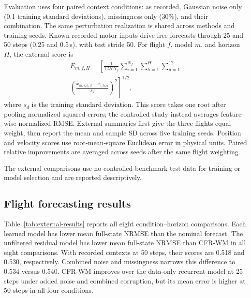 \documentclass[pdflatex,sn-basic]{sn-jnl}
\newcommand{\ExternalCFRCombinedLongNRMSEMean}{0.540}
\newcommand{\ExternalCFRRecordedLongNRMSEMean}{0.530}
\newcommand{\ExternalUnfilteredCombinedLongNRMSEMean}{0.534}
\newcommand{\ExternalUnfilteredRecordedLongNRMSEMean}{0.518}
\begin{document}
Evaluation uses four paired context conditions: as recorded, Gaussian noise
only (0.1 training standard deviations), missingness only (30\%), and their
combination. The same perturbation realization is shared across methods and
training seeds. Known recorded motor inputs drive free forecasts through
25 and 50 steps (0.25 and 0.5\,s), with test stride 50. For flight $f$, model
$m$, and horizon $H$, the external score is
\begin{equation}
\begin{aligned}
 E_{m,f,H}=\left[\frac{1}{12H N_f}
 \sum_{i=1}^{N_f}\sum_{h=1}^{H}\sum_{d=1}^{12}\right.\\[-0.2em]
 \left.\left(\frac{\widehat{x}_{m,i,h,d}-x_{i,h,d}}{s_d}\right)^2
 \right]^{1/2},
\end{aligned}
 \label{eq:external-score}
\end{equation}
where $s_d$ is the training standard deviation. This score takes one root
after pooling normalized squared errors; the controlled study instead
averages feature-wise normalized RMSE. External summaries first give the
three flights equal weight, then report the mean and sample SD across five
training seeds. Position and velocity scores use root-mean-square Euclidean
error in physical units. Paired relative improvements are averaged across
seeds after the same flight weighting.

The external comparisons use no controlled-benchmark test data for training or
model selection and are reported descriptively.

\subsection{Flight forecasting results}

Table~\ref{tab:external-results} reports all eight condition--horizon
comparisons. Each learned model has lower mean full-state NRMSE than the
nominal forecast. The unfiltered residual model has lower mean full-state
NRMSE than CFR-WM in all eight comparisons. With recorded contexts at 50 steps,
their scores are \ExternalUnfilteredRecordedLongNRMSEMean{} and
\ExternalCFRRecordedLongNRMSEMean{}, respectively. Combined noise and
missingness narrows this difference to
\ExternalUnfilteredCombinedLongNRMSEMean{} versus
\ExternalCFRCombinedLongNRMSEMean{}.
CFR-WM improves over the data-only recurrent model at 25 steps under added
noise and combined corruption, but its mean error is higher at 50 steps
in all four conditions.
\end{document}
